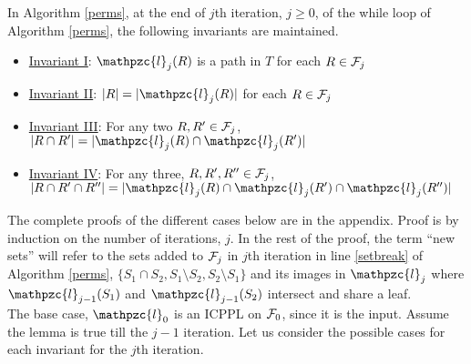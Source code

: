 \documentclass{fsttcs}
\def\cF{{\cal F}}
\def\cl{\mathpzc{l}}
\begin{document}
\begin{lemma}
\label{lem:invar1}
  In Algorithm \ref{perms}, at the end of $j$th iteration, $j \ge 0$, of the while loop of 
  Algorithm \ref{perms}, the following invariants are maintained.
\begin{itemize}
\item []\underline {Invariant I}: $\cl_j(R)$ is a path in $T$ for each $R \in \cF_j$
\item []\underline {Invariant II}: $|R| = |\cl_j(R)|$ for each $R \in \cF_j$
\item []\underline {Invariant III}: For any two $R, R' \in \cF_j$,
  $|R \cap R'| = |\cl_j(R) \cap \cl_j(R')|$
\item []\underline {Invariant IV}: For any three, $R, R', R'' \in \cF_j$,
  $|R \cap R' \cap R''|=|\cl_j(R) \cap \cl_j(R') \cap \cl_j(R'')|$
\end{itemize}
\end{lemma}
\proof
The complete proofs of the different cases below are in the appendix.
  Proof is by induction on the number of iterations, $j$. In the rest
  of the proof, the term ``new sets'' will refer to the sets added
  to $\cF_j$ in $j$th iteration in line \ref{setbreak} of Algorithm
  \ref{perms}, $\{S_1 \cap S_2, S_1 \setminus S_2, S_2 \setminus S_1
  \}$ and its images in $\cl_j$ where $\cl_{j-1}(S_1)$ and
  $\cl_{j-1}(S_2)$
  intersect and share a leaf.\\
  \noindent
  The base case, $\cl_0$ is an ICPPL on $\cF_0$, since it is the
  input.  Assume the lemma is true till the $j-1$ iteration. Let us consider
the possible cases for each invariant for the  $j$th  iteration.
\end{document}
